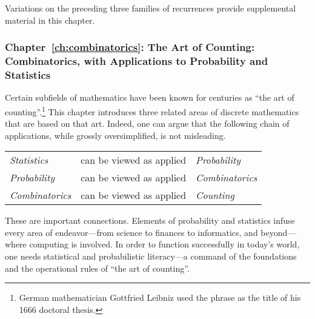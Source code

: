 Variations on the preceding three families of recurrences provide supplemental material in this chapter.


\subsubsection{Chapter~\ref{ch:combinatorics}: 
The Art of Counting: Combinatorics, with Applications to Probability and Statistics}

Certain subfields of mathematics have been known for centuries as ``the art of counting''.\footnote{German mathematician Gottfried Leibniz used the phrase as the title of his 1666 doctoral thesis.}  This chapter introduces three related areas of discrete mathematics that are based on that art.  Indeed, one can argue that the following chain of applications, while grossly oversimplified, is not misleading.

\smallskip

\begin{tabular}{lcl}
{\it Statistics} & can be viewed as applied & {\it Probability} \\
{\it Probability} & can be viewed as applied & {\it Combinatorics} \\
{\it Combinatorics} & can be viewed as applied & {\it Counting}
\end{tabular}

\smallskip

\noindent
These are important connections.  Elements of probability and statistics infuse every area of endeavor---from science to finances to informatics, and beyond---where computing is involved.  In order to function successfully in today's world, one needs statistical and probabilistic literacy---a command of the foundations and the operational rules of ``the art of counting''.


